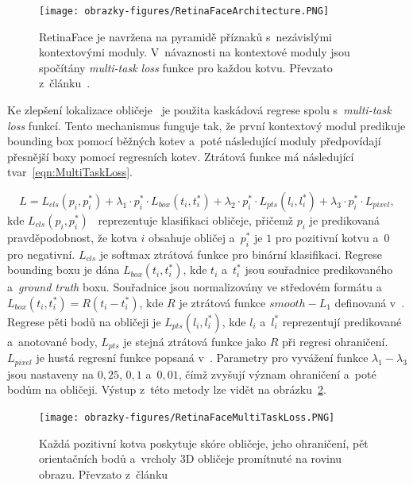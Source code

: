 \begin{figure}[hbt]
	\centering
	\setlength{\fboxsep}{0pt}
	\texttt{[image: obrazky-figures/RetinaFaceArchitecture.PNG]}
	\caption{RetinaFace je navržena na pyramidě příznaků s~nezávislými kontextovými moduly. V~návaznosti na kontextové moduly jsou spočítány \emph{multi-task loss} funkce pro každou kotvu. Převzato z~článku~\cite{article:RetinaFace}.}
	\label{img:RetinaFaceArchitecture}
\end{figure}

Ke zlepšení lokalizace obličeje~\cite{website:RetinaFace} je použita kaskádová regrese spolu s~\emph{multi-task loss} funkcí. Tento mechanismus funguje tak, že první kontextový modul predikuje bounding box pomocí běžných kotev a~poté následující moduly předpovídají přesnější boxy pomocí regresních kotev. Ztrátová funkce má následující tvar~\ref{eqn:MultiTaskLoss}.

\begin{equation}
    \label{eqn:MultiTaskLoss}
    L = L_{cls}(p_{i}, p_{i}^{*}) + \lambda_{1} \cdot p_{i}^{*} \cdot L_{box}(t_{i},t_{i}^{*}) + \lambda_{2} \cdot p_{i}^{*} \cdot L_{pts}(l_{i},l_{i}^{*}) + \lambda_{3} \cdot p_{i}^{*} \cdot L_{pixel},
\end{equation}
kde $L_{cls}(p_{i}, p_{i}^{*})$~\cite{article:RetinaFace} reprezentuje klasifikaci obličeje, přičemž $p_{i}$ je predikovaná pravděpodobnost, že kotva $i$ obsahuje obličej a~$p_{i}^{*}$ je $1$ pro pozitivní kotvu a~$0$ pro negativní. $L_{cls}$ je softmax ztrátová funkce pro binární klasifikaci. Regrese bounding boxu je dána $L_{box}(t_{i},t_{i}^{*})$, kde $t_{i}$ a~$t_{i}^{*}$ jsou souřadnice predikovaného a~\emph{ground truth} boxu. Souřadnice jsou normalizovány ve středovém formátu a~$L_{box}(t_{i},t_{i}^{*}) = R(t_{i} - t_{i}^{*})$, kde $R$ je ztrátová funkce $smooth - L_{1}$ definovaná v~\cite{article:FastRCNN}. Regrese pěti bodů na obličeji je $L_{pts}(l_{i},l_{i}^{*})$, kde $l_{i}$ a~$l_{i}^{*}$ reprezentují predikované a~anotované body, $L_{pts}$ je stejná ztrátová funkce jako $R$ při regresi ohraničení. $L_{pixel}$ je hustá regresní funkce popsaná v~\cite{article:RetinaFace}. Parametry pro vyvážení funkce $\lambda_{1} - \lambda_{3}$ jsou nastaveny na $0,25$, $0,1$ a~$0,01$, čímž zvyšují význam ohraničení a~poté bodům na obličeji. Výstup z~této metody lze vidět na obrázku~\ref{img:RetinaFaceMultiTaskLoss}.

\begin{figure}[hbt]
	\centering
	\setlength{\fboxsep}{0pt}
	\texttt{[image: obrazky-figures/RetinaFaceMultiTaskLoss.PNG]}
	\caption{Každá pozitivní kotva poskytuje skóre obličeje, jeho ohraničení, pět orientačních bodů a~vrcholy 3D obličeje promítnuté na rovinu obrazu. Převzato z~článku~\cite{article:RetinaFace}}
	\label{img:RetinaFaceMultiTaskLoss}
\end{figure}

